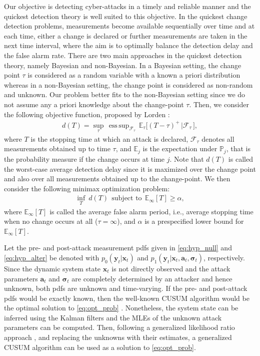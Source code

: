 \documentclass[onecolumn]{IEEEtran}
\def\inf{\mathop{\mathrm{inf}}}
\DeclareMathOperator*{\esssup}{ess\,sup}
\begin{document}
Our objective is detecting cyber-attacks in a timely and reliable manner and the quickest detection theory \cite{Poor08,Basseville93,Veeravalli14} is well suited to this objective. In the quickest change detection problems, measurements become available sequentially over time and at each time, either a change is declared or further measurements are taken in the next time interval, where the aim is to optimally balance the detection delay and the false alarm rate. There are two main approaches in the quickest detection theory, namely Bayesian and non-Bayesian. In a Bayesian setting, the change point $\tau$ is considered as a random variable with a known a priori distribution whereas in a non-Bayesian setting, the change point is considered as non-random and unknown. Our problem better fits to the non-Bayesian setting since we do not assume any a priori knowledge about the change-point $\tau$. Then, we consider the following objective function, proposed by Lorden \cite{Lorden_71}:
\begin{gather} \label{eq:det_delay}
d(T) = \sup_{\tau} \, \esssup_{\mathcal{F}_\tau} \, \mathbb{E}_\tau \big[(T-\tau)^+\,|\mathcal{F}_\tau\,\big],
\end{gather}
where $T$ is the stopping time at which an attack is declared, $\mathcal{F}_\tau$ denotes all measurements obtained up to time $\tau$, and $\mathbb{E}_j$ is the expectation under $\mathbb{P}_j$, that is the probability measure if the change occurs at time $j$. Note that $d(T)$ is called the worst-case average detection delay since it is maximized over the change point and also over all measurements obtained up to the change-point. We then consider the following minimax optimization problem:
\begin{gather} \label{eq:opt_prob}
\inf_{T}~ d(T) ~~ \text{subject to} ~~ \mathbb{E}_\infty[T] \geq \alpha,
\end{gather}
where $\mathbb{E}_\infty[T]$ is called the average false alarm period, i.e., average stopping time when no change occurs at all ($\tau = \infty$), and $\alpha$ is a prespecified lower bound for $\mathbb{E}_\infty[T]$.

Let the pre- and post-attack measurement pdfs given in \eqref{eq:hyp_null} and \eqref{eq:hyp_alter} be denoted with $p_0(\mathbf{y}_t|\mathbf{x}_t)$ and $p_1(\mathbf{y}_t|\mathbf{x}_t, \mathbf{a}_t, \pmb{\sigma}_t)$, respectively. Since the dynamic system state $\mathbf{x}_t$ is not directly observed and the attack parameters $\mathbf{a}_t$ and $\pmb{\sigma}_t$ are completely determined by an attacker and hence unknown, both pdfs are unknown and time-varying. If the pre- and post-attack pdfs would be exactly known, then the well-known CUSUM algorithm would be the optimal solution to \eqref{eq:opt_prob} \cite{Moustakides_86}. Nonetheless, the system state can be inferred using the Kalman filters and the MLEs of the unknown attack parameters can be computed. Then, following a generalized likelihood ratio approach \cite[Sec.~5.3]{Basseville93}, \cite{Li_15,Necip18} and replacing the unknowns with their estimates, a generalized CUSUM algorithm can be used as a solution to \eqref{eq:opt_prob}.
\end{document}
